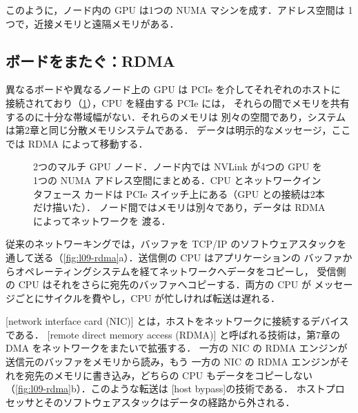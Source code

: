 \documentclass[../main.tex]{subfiles}
\begin{document}
%
このように，ノード内の GPU は1つの NUMA マシンを成す．アドレス空間は
1つで，近接メモリと遠隔メモリがある．

\subsection{ボードをまたぐ：RDMA}

異なるボードや異なるノード上の GPU は PCIe を介してそれぞれのホストに
接続されており（\cref{fig:l09-nodes}），CPU を経由する PCIe には，
それらの間でメモリを共有するのに十分な帯域幅がない．それらのメモリは
別々の空間であり，システムは第2章と同じ分散メモリシステムである．
データは明示的なメッセージ，ここでは RDMA によって移動する．

\begin{figure}[tb]
  \centering
  
  \caption{2つのマルチ GPU ノード．ノード内では NVLink が4つの GPU を
    1つの NUMA アドレス空間にまとめる．CPU とネットワークインタフェース
    カードは PCIe スイッチ上にある（GPU との接続は2本だけ描いた）．
    ノード間ではメモリは別々であり，データは RDMA によってネットワークを
    渡る．}
  \label{fig:l09-nodes}
\end{figure}

従来のネットワーキングでは，バッファを TCP/IP のソフトウェアスタックを
通して送る（\cref{fig:l09-rdma}a）．送信側の CPU はアプリケーションの
バッファからオペレーティングシステムを経てネットワークへデータをコピーし，
受信側の CPU はそれをさらに宛先のバッファへコピーする．両方の CPU が
メッセージごとにサイクルを費やし，CPU が忙しければ転送は遅れる．

\begin{definition}
  [network interface card (NIC)]
  とは，ホストをネットワークに接続するデバイスである．
  [remote direct memory access (RDMA)]
  と呼ばれる技術は，第7章の DMA をネットワークをまたいで拡張する．
  一方の NIC の RDMA エンジンが送信元のバッファをメモリから読み，もう
  一方の NIC の RDMA エンジンがそれを宛先のメモリに書き込み，どちらの
  CPU もデータをコピーしない（\cref{fig:l09-rdma}b）．このような転送は
  [host bypass]の技術である．
  ホストプロセッサとそのソフトウェアスタックはデータの経路から外される．
\end{definition}
\end{document}
